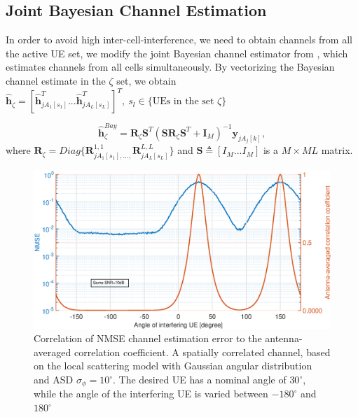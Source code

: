 \subsection{Joint Bayesian Channel Estimation}
In order to avoid high inter-cell-interference, we need to obtain channels from all the active UE set, we modify the joint Bayesian channel estimator from \cite{yin2013coordinated}, which estimates channels from all cells simultaneously. By vectorizing the Bayesian channel estimate in the $\zeta$ set, we obtain $\hat{\mathbf{h}}_{\zeta}=[\hat{\mathbf{h}}_{jA_{1}[s_{1}]}^{T}...\hat{\mathbf{h}}_{jA_{L}[s_{L}]}^{T}]^{T},\:s_{l}\in \{\text{UEs in the set } \zeta\}$ 

\begin{equation}
\hat{\mathbf{h}}_{\zeta}^{Bay}=\mathbf{R}_{\zeta}\mathbf{S}^{T}%
(\mathbf{S}\mathbf{R}_{\zeta}\mathbf{S}^{T}+\mathbf{I}_{M})^{-1}\mathbf{y}_{jA_{j}[k]},
\end{equation}
where $\mathbf{R}_{\zeta}=Diag\{\mathbf{R}^{1,1}_{jA_{1}[s_{1}],...,}\mathbf{R}^{L,L}_{jA_{L}[s_{L}]}\} $ and %
$\mathbf{S}\triangleq[I_{M}...I_{M}]$ is a $M\times ML$ matrix.





\begin{figure}[t!]
	\centering
	\includegraphics[width=1.0\linewidth]{figures/NMSE_correlation.eps}
	\caption{Correlation of NMSE channel estimation error to the antenna-averaged correlation coefficient. A spatially correlated channel, based on
the local scattering model with Gaussian angular distribution and ASD $ \sigma_\phi= 10^\circ$. The desired UE has a nominal angle of $30^\circ$, while the angle of the interfering UE
is varied between $-180^\circ$ and $180^\circ$}
	\label{fig:channel_correlation_model}
\end{figure}

